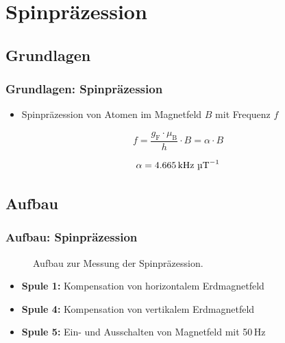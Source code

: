 
\section{Spinpräzession}
\subsection{Grundlagen}
\begin{frame}
\frametitle{Grundlagen: Spinpräzession}

\begin{itemize}
  \item Spinpräzession von Atomen im Magnetfeld $B$ mit Frequenz $f$
\end{itemize}


\begin{equation*}
    f=\frac{g_\text{F} \cdot \mu_\text{B}}{h} \cdot B = \alpha \cdot B
\end{equation*}
  
  
\begin{equation*}
    \alpha = 4.665\,\text{kHz } \text{\textmu T}^{-1}
\end{equation*}

\end{frame}

\subsection{Aufbau}
\begin{frame}
\frametitle{Aufbau: Spinpräzession}

\begin{figure}
    \centering
    \def\svgwidth{\textwidth}
    
    \caption{Aufbau zur Messung der Spinpräzession.}
\end{figure}

\begin{itemize}
  \item \textbf{Spule 1:} Kompensation von horizontalem Erdmagnetfeld
  \item \textbf{Spule 4:} Kompensation von vertikalem Erdmagnetfeld
  \item \textbf{Spule 5:} Ein- und Ausschalten von Magnetfeld mit 50\,Hz
\end{itemize}

\end{frame}

